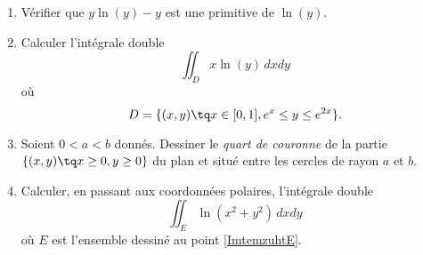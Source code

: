 
\begin{exercice}\label{exoOutilsMath-0128}

    \begin{enumerate}
        \item
            Vérifier que \( y\ln(y)-y\) est une primitive de \( \ln(y)\).
        \item
            Calculer l'intégrale double
            \begin{equation}
                \iint_Dx\ln(y)\,dxdy
            \end{equation}
            où
            \begin{equation}
                D=\{ (x,y)\tq x\in\mathopen[ 0 , 1 \mathclose], e^{x}\leq y\leq  e^{2x} \}.
            \end{equation}
        \item   \label{ImtemzuhtE}
            Soient \( 0<a<b\) donnés. Dessiner le \emph{quart de couronne} de la partie \( \{ (x,y)\tq x\geq 0,y\geq 0 \}\) du plan et situé entre les cercles de rayon \( a\) et \( b\).
        \item
            Calculer, en passant aux coordonnées polaires, l'intégrale double
            \begin{equation}
                \iint_E\ln(x^2+y^2)\,dxdy
            \end{equation}
            où \( E\) est l'ensemble dessiné au point \ref{ImtemzuhtE}.
    \end{enumerate}

\end{exercice}
